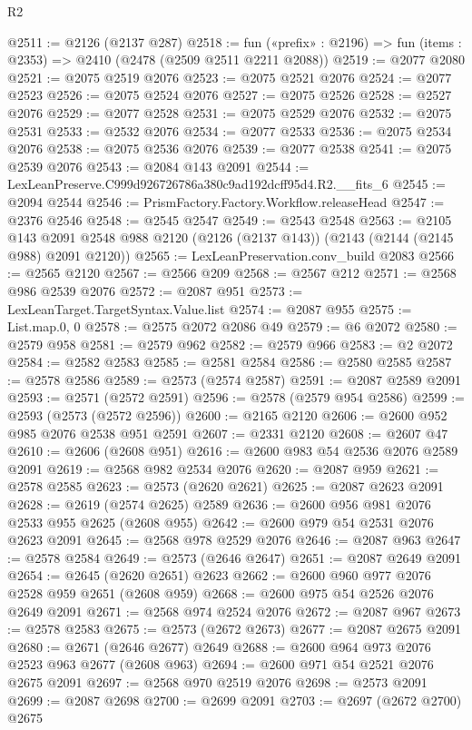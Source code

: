 \begin{lexlean}{R2}
\begin{coremodule}
@2511 := @2126 (@2137 @287)
@2518 := fun («prefix» : @2196) => fun (items : @2353) => @2410 (@2478 (@2509 @2511 @2211 @2088))
@2519 := @2077 @2080
@2521 := @2075 @2519 @2076
@2523 := @2075 @2521 @2076
@2524 := @2077 @2523
@2526 := @2075 @2524 @2076
@2527 := @2075 @2526
@2528 := @2527 @2076
@2529 := @2077 @2528
@2531 := @2075 @2529 @2076
@2532 := @2075 @2531
@2533 := @2532 @2076
@2534 := @2077 @2533
@2536 := @2075 @2534 @2076
@2538 := @2075 @2536 @2076
@2539 := @2077 @2538
@2541 := @2075 @2539 @2076
@2543 := @2084 @143 @2091
@2544 := LexLeanPreserve.C999d926726786a380c9ad192dcff95d4.R2.__fits_6
@2545 := @2094 @2544
@2546 := PrismFactory.Factory.Workflow.releaseHead
@2547 := @2376 @2546
@2548 := @2545 @2547
@2549 := @2543 @2548
@2563 := @2105
    @143
    @2091
    @2548
    @988
    @2120
    (@2126 (@2137 @143))
    (@2143 (@2144 (@2145 @988) @2091 @2120))
@2565 := LexLeanPreservation.conv_build @2083
@2566 := @2565 @2120
@2567 := @2566 @209
@2568 := @2567 @212
@2571 := @2568 @986 @2539 @2076
@2572 := @2087 @951
@2573 := LexLeanTarget.TargetSyntax.Value.list
@2574 := @2087 @955
@2575 := List.map.{0, 0}
@2578 := @2575 @2072 @2086 @49
@2579 := @6 @2072
@2580 := @2579 @958
@2581 := @2579 @962
@2582 := @2579 @966
@2583 := @2 @2072
@2584 := @2582 @2583
@2585 := @2581 @2584
@2586 := @2580 @2585
@2587 := @2578 @2586
@2589 := @2573 (@2574 @2587)
@2591 := @2087 @2589 @2091
@2593 := @2571 (@2572 @2591)
@2596 := @2578 (@2579 @954 @2586)
@2599 := @2593 (@2573 (@2572 @2596))
@2600 := @2165 @2120
@2606 := @2600 @952 @985 @2076 @2538 @951 @2591
@2607 := @2331 @2120
@2608 := @2607 @47
@2610 := @2606 (@2608 @951)
@2616 := @2600 @983 @54 @2536 @2076 @2589 @2091
@2619 := @2568 @982 @2534 @2076
@2620 := @2087 @959
@2621 := @2578 @2585
@2623 := @2573 (@2620 @2621)
@2625 := @2087 @2623 @2091
@2628 := @2619 (@2574 @2625) @2589
@2636 := @2600 @956 @981 @2076 @2533 @955 @2625 (@2608 @955)
@2642 := @2600 @979 @54 @2531 @2076 @2623 @2091
@2645 := @2568 @978 @2529 @2076
@2646 := @2087 @963
@2647 := @2578 @2584
@2649 := @2573 (@2646 @2647)
@2651 := @2087 @2649 @2091
@2654 := @2645 (@2620 @2651) @2623
@2662 := @2600 @960 @977 @2076 @2528 @959 @2651 (@2608 @959)
@2668 := @2600 @975 @54 @2526 @2076 @2649 @2091
@2671 := @2568 @974 @2524 @2076
@2672 := @2087 @967
@2673 := @2578 @2583
@2675 := @2573 (@2672 @2673)
@2677 := @2087 @2675 @2091
@2680 := @2671 (@2646 @2677) @2649
@2688 := @2600 @964 @973 @2076 @2523 @963 @2677 (@2608 @963)
@2694 := @2600 @971 @54 @2521 @2076 @2675 @2091
@2697 := @2568 @970 @2519 @2076
@2698 := @2573 @2091
@2699 := @2087 @2698
@2700 := @2699 @2091
@2703 := @2697 (@2672 @2700) @2675

\end{coremodule}
\end{lexlean}
